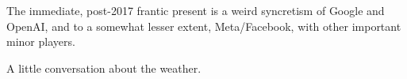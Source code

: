 \documentclass[handout]{beamer} %
\begin{document}

\begin{frame}
	The immediate, post-2017 frantic present is a weird syncretism of Google and OpenAI, and to a somewhat lesser extent, Meta/Facebook, with other important minor players.
\end{frame} 


\begin{frame}
	A little conversation about the weather.
\end{frame}

\begin{frame}[plain]
\end{frame}
\end{document}
